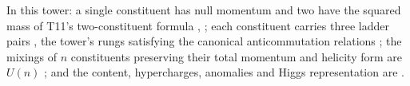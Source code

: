 In this tower: a single constituent has null momentum and two have the squared mass of T11's two-constituent formula \cite[Prop.~4.1]{ButlerT11}, \cite[Fact~2.1]{ButlerT12}; each constituent carries three ladder pairs \cite[Fact~2.2, Lem.~2.12]{ButlerT12}, the tower's rungs satisfying the canonical anticommutation relations \cite[Prop.~4.1]{ButlerT3}; the mixings of $n$ constituents preserving their total momentum and helicity form are $U(n)$ \cite[Prop.~3.1]{ButlerT12}; and the content, hypercharges, anomalies and Higgs representation are \cite[Thm.~4.1, Thm.~4.2, Prop.~5.3, Thm.~5.5, Prop.~9.22]{ButlerT12}.
